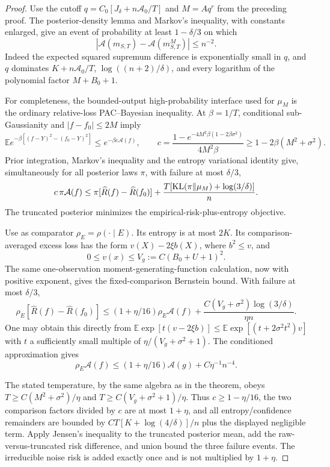 \begin{proof}
Use the cutoff $q=C_0[J_\delta+n\mathcal A_0/T]$ and $M=Aq^r$ from the preceding proof. The posterior-density lemma and Markov's inequality, with constants enlarged, give an event of probability at least $1-\delta/3$ on which
\[
 |\mathcal A(m_{S,T})-\mathcal A(m^M_{S,T})|\le n^{-2}.
\]
Indeed the expected squared supremum difference is exponentially small in $q$, and $q$ dominates $K+n\mathcal A_0/T$, $\log((n+2)/\delta)$, and every logarithm of the polynomial factor $M+B_0+1$.

For completeness, the bounded-output high-probability interface used for $\mu_M$ is the ordinary relative-loss PAC--Bayesian inequality. At $\beta=1/T$, conditional sub-Gaussianity and $|f-f_0|\le2M$ imply
\[
 \mathbb E e^{-\beta[(f-Y)^2-(f_0-Y)^2]}
 \le e^{-\beta c\mathcal A(f)},\qquad
 c=\frac{1-e^{-4M^2\beta(1-2\beta\sigma^2)}}{4M^2\beta}
       \ge1-2\beta(M^2+\sigma^2).
\]
Prior integration, Markov's inequality and the entropy variational identity give, simultaneously for all posterior laws $\pi$, with failure at most $\delta/3$,
\[
 c\,\pi\mathcal A(f)\le
 \pi[\widehat R(f)-\widehat R(f_0)]
       +\frac{T[\operatorname{KL}(\pi\|\mu_M)+\log(3/\delta)]}{n}.
\]
The truncated posterior minimizes the empirical-risk-plus-entropy objective.

Use as comparator $\rho_E=\rho(\cdot\mid E)$. Its entropy is at most $2K$. Its comparison-averaged excess loss has the form
$v(X)-2\xi b(X)$, where $b^2\le v$, and
\[
 0\le v(x)\le V_g:=C(B_0+U+1)^2.
\]
The same one-observation moment-generating-function calculation, now with positive exponent, gives the fixed-comparison Bernstein bound. With failure at most $\delta/3$,
\[
 \rho_E[\widehat R(f)-\widehat R(f_0)]
 \le(1+\eta/16)\rho_E\mathcal A(f)
       +\frac{C(V_g+\sigma^2)\log(3/\delta)}{\eta n}.
\]
One may obtain this directly from
$\mathbb E\exp[t(v-2\xi b)]\le\mathbb E\exp[(t+2\sigma^2t^2)v]$
with $t$ a sufficiently small multiple of $\eta/(V_g+\sigma^2+1)$.
The conditioned approximation gives
\[
 \rho_E\mathcal A(f)
 \le(1+\eta/16)\mathcal A(g)+C\eta^{-1}n^{-4}.
\]

The stated temperature, by the same algebra as in the theorem, obeys
$T\ge C(M^2+\sigma^2)/\eta$ and
$T\ge C(V_g+\sigma^2+1)/\eta$.
Thus $c\ge1-\eta/16$, the two comparison factors divided by $c$ are at most $1+\eta$, and all entropy/confidence remainders are bounded by
$CT[K+\log(4/\delta)]/n$ plus the displayed negligible term. Apply Jensen's inequality to the truncated posterior mean, add the raw-versus-truncated risk difference, and union bound the three failure events. The irreducible noise risk is added exactly once and is not multiplied by $1+\eta$.
\end{proof}
